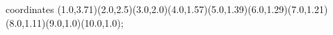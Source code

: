 					coordinates { (1.0,3.71)(2.0,2.5)(3.0,2.0)(4.0,1.57)(5.0,1.39)(6.0,1.29)(7.0,1.21)(8.0,1.11)(9.0,1.0)(10.0,1.0)};